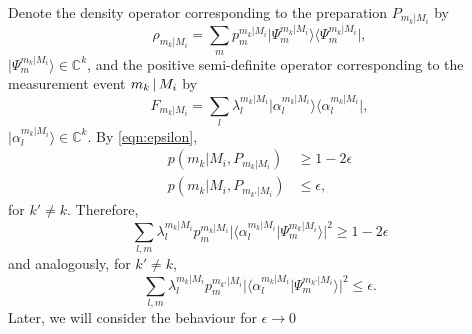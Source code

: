 Denote the density operator corresponding to the preparation $P_{m_k\vert M_i}$ by 
\begin{equation}
\label{eqn:densityop}
\rho_{m_k\vert M_i} = \sum_m p_m^{m_k\vert M_i} \vert \Psi_m^{m_k\vert M_i}\rangle\langle \Psi_m^{m_k\vert M_i} \vert,
\end{equation} $\vert \Psi_m^{m_k\vert M_i} \rangle \in \mathbb{C}^k$, and the positive semi-definite operator corresponding to the measurement event $m_k\thinspace\vert\thinspace M_i$ by
\begin{equation}
\label{eqn:mntop}
F_{m_k\vert M_i}=\sum_l \lambda_l^{m_k\vert M_i} \vert \alpha_l^{m_k\vert M_i}\rangle \langle \alpha_l^{m_k\vert M_i} \vert,
\end{equation} $\vert \alpha_l^{m_k\vert M_i} \rangle \in \mathbb{C}^k$.
By \ref{eqn:epsilon},
\begin{align*}
p(m_k\vert M_i, P_{m_k\vert M_i}) & \geq 1-2\epsilon \\
p(m_k\vert M_i, P_{m_{k'}\vert M_i}) & \leq \epsilon,
\end{align*}
for $k'\neq k$.
Therefore,
\begin{equation}
\label{eqn:cond1}
\sum_{l,m}\lambda_l^{m_k\vert M_i}p_m^{m_k\vert M_i}\vert \langle \alpha_l^{m_k\vert M_i} \vert \Psi_m^{m_k\vert M_i} \rangle \vert^2 \geq 1-2\epsilon
\end{equation}
and analogously, for $k'\neq k$,
\begin{equation}
\label{eqn:cond2}
\sum_{l,m}\lambda_l^{m_k\vert M_i}p_m^{m_{k'}\vert M_i}\vert \langle \alpha_l^{m_k\vert M_i} \vert \Psi_m^{m_{k'}\vert M_i} \rangle \vert^2 \leq \epsilon.
\end{equation}
Later, we will consider the behaviour for $\epsilon\rightarrow 0$

